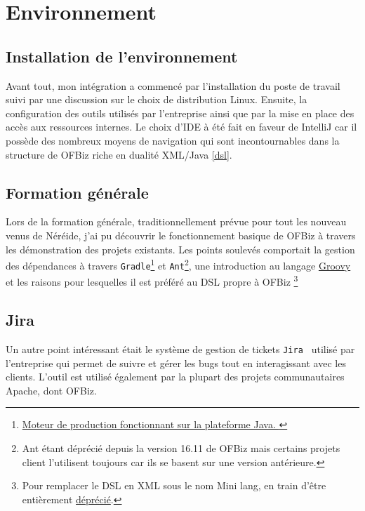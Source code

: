 \newpage









\section{Environnement}

\subsection{Installation de l'environnement}
Avant tout, mon intégration a commencé par l'installation du poste de travail suivi par une discussion sur le choix de distribution Linux. Ensuite, la configuration des outils utilisés par l'entreprise ainsi que par la mise en place des accès aux ressources internes. Le choix d'IDE à été fait en faveur de IntelliJ car il possède des nombreux moyens de navigation qui sont incontournables dans la structure de OFBiz riche en dualité XML/Java \ref{dsl}. 




\subsection{Formation générale}


Lors de la formation générale, traditionnellement prévue pour tout les nouveau venus de Néréide, j'ai pu découvrir le fonctionnement basique de OFBiz à travers les démonstration des projets existants. Les points soulevés comportait la gestion des dépendances à travers \verb|Gradle|\footnote{\href{https://gradle.org/}{Moteur de production fonctionnant sur la plateforme Java. }} et \verb|Ant|\footnote{Ant étant déprécié depuis la version 16.11 de OFBiz mais certains projets client l'utilisent toujours car ils se basent sur une version antérieure.  }, une introduction au langage \href{http://groovy-lang.org/}{Groovy} et les raisons pour lesquelles il est préféré au DSL propre à OFBiz \footnote{Pour remplacer le DSL en XML  sous le nom Mini lang, en train d'être entièrement \href{https://cwiki.apache.org/confluence/display/OFBIZ/Mini+Lang+Deprecation}{déprécié}. }


\subsection{Jira}
Un autre point intéressant était le système de gestion de tickets \verb|Jira | utilisé par l'entreprise qui permet de suivre et gérer les bugs tout en interagissant avec les clients. L'outil est utilisé également par la plupart des projets communautaires Apache, dont OFBiz.

